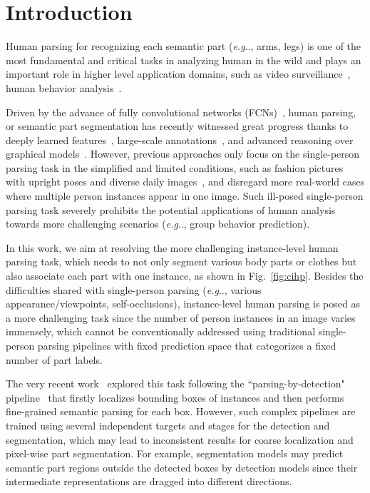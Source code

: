 \documentclass[runningheads]{llncs}
\makeatletter
\DeclareRobustCommand\onedot{\futurelet\@let@token\@onedot}
\def\@onedot{\ifx\@let@token.\else.\null\fi\xspace}
\def\eg{\emph{e.g}\onedot} \def\Eg{\emph{E.g}\onedot}
\makeatother
\begin{document}
\section{Introduction}

Human parsing for recognizing each semantic part (\eg, arms, legs) is one of the most fundamental and critical tasks in analyzing human in the wild and plays an important role in higher level application domains, such as video surveillance~\cite{wang2014deformable}, human behavior analysis~\cite{gan2016concepts,liang2015proposal}. 

Driven by the advance of fully convolutional networks (FCNs)~\cite{long2014fully}, human parsing, or semantic part segmentation has recently witnessed great progress thanks to deeply learned features~\cite{simonyan2014very,he2015deep}, large-scale annotations~\cite{DBLP:journals/corr/LinMBHPRDZ14,Gong_2017_CVPR}, and advanced reasoning over graphical models~\cite{crfasrnn,chen2016deeplab}. However, previous approaches only focus on the single-person parsing task in the simplified and limited conditions, such as fashion pictures~\cite{Yamaguchiparsing13,Dongparsing13,ATR,Co-CNN,chen2014detect} with upright poses and diverse daily images~\cite{Gong_2017_CVPR}, and disregard more real-world cases where multiple person instances appear in one image.  Such ill-posed single-person parsing task severely prohibits the potential applications of human analysis towards more challenging scenarios (\eg, group behavior prediction). 

In this work, we aim at resolving the more challenging instance-level human parsing task, which needs to not only segment various body parts or clothes but also associate each part with one instance, as shown in Fig.~\ref{fig:cihp}. Besides the difficulties shared with single-person parsing (\eg, various appearance/viewpoints, self-occlusions), instance-level human parsing is posed as a more challenging task since the number of person instances in an image varies immensely, which cannot be conventionally addressed using traditional single-person parsing pipelines with fixed prediction space that categorizes a fixed number of part labels.

The very recent work~\cite{li2017holistic} explored this task following the ``parsing-by-detection" pipeline~\cite{hariharan2014simultaneous,liang2016reversible,Dai_2016_CVPR,pinheiro2015learning,He_2017_ICCV} that firstly localizes bounding boxes of instances and then performs fine-grained semantic parsing for each box. However, such complex pipelines are trained using several independent targets and stages for the detection and segmentation, which may lead to inconsistent results for coarse localization and pixel-wise part segmentation. For example, segmentation models may predict semantic part regions outside the detected boxes by detection models since their intermediate representations are dragged into different directions. 
\end{document}
